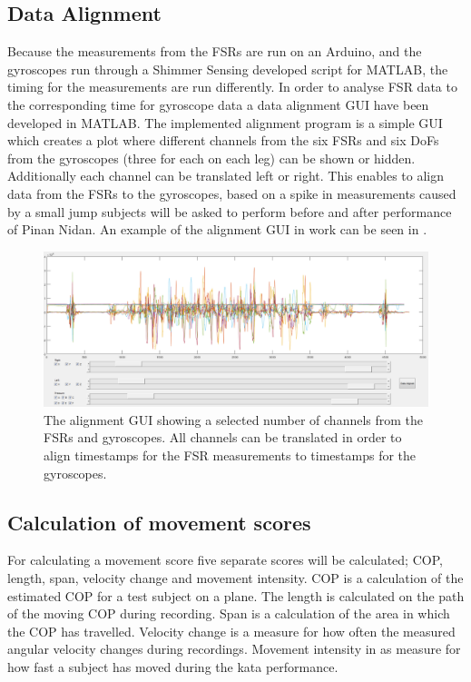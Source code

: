 \subsection{Data Alignment}
Because the measurements from the FSRs are run on an Arduino, and the gyroscopes run through a Shimmer Sensing developed script for MATLAB, the timing for the measurements are run differently. In order to analyse FSR data to the corresponding time for gyroscope data a data alignment GUI have been developed in MATLAB. The implemented alignment program is a simple GUI which creates a plot where different channels from the six FSRs and six DoFs from the gyroscopes (three for each on each leg) can be shown or hidden. Additionally each channel can be translated left or right. This enables to align data from the FSRs to the gyroscopes, based on a spike in measurements caused by a small jump subjects will be asked to perform before and after performance of Pinan Nidan. An example of the alignment GUI in work can be seen in .

\begin{figure}[H]
	\includegraphics[width=.6\textwidth]{figures/alignGUI}
	\caption{The alignment GUI showing a selected number of channels from the FSRs and gyroscopes. All channels can be translated in order to align timestamps for the FSR measurements to timestamps for the gyroscopes.}
	\label{fig:alignGUI}  %
\end{figure}


\subsection{Calculation of movement scores}

For calculating a movement score five separate scores will be calculated; COP, length, span, velocity change and movement intensity. COP is a calculation of the estimated COP for a test subject on a plane. The length is calculated on the path of the moving COP during recording. Span is a calculation of the area in which the COP has travelled. Velocity change is a measure for how often the measured angular velocity changes during recordings. Movement intensity in as measure for how fast a subject has moved during the kata performance. 

